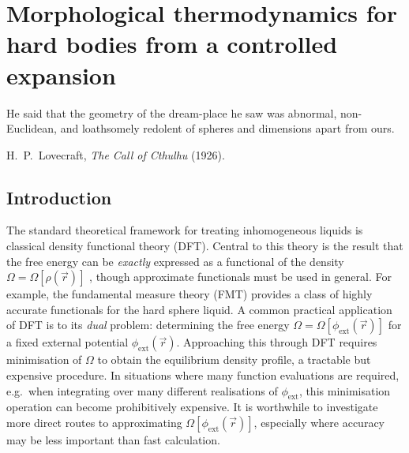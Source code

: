 \documentclass[11pt,twoside]{report}
\begin{document}
\chapter{Morphological thermodynamics for hard bodies from a controlled expansion}
\epigraph{He said that the geometry of the dream-place he saw was abnormal, non-Euclidean, and loathsomely redolent of spheres and dimensions apart from ours.}{H.\ P.\ Lovecraft, \emph{The Call of Cthulhu} (1926).}
\label{chapter:resummation}

\section{Introduction}

The standard theoretical framework for treating inhomogeneous liquids is classical density functional theory (DFT).
Central to this theory is the result that the free energy can be \emph{exactly} expressed as a functional of the density $\Omega = \Omega[\rho(\vec{r})]$ \cite{EvansAP1979}, though approximate functionals must be used in general.
For example, the fundamental measure theory (FMT) \cite{RosenfeldPRL1989} provides a class of highly accurate functionals for the hard sphere liquid.
A common practical application of DFT is to its \emph{dual} problem: determining the free energy $\Omega = \Omega[\phi_\mathrm{ext}(\vec{r})]$ for a fixed external potential $\phi_\mathrm{ext}(\vec{r})$.
Approaching this through DFT requires minimisation of $\Omega$ to obtain the equilibrium density profile, a tractable but expensive procedure.
In situations where many function evaluations are required, e.g.\ when integrating over many different realisations of $\phi_\mathrm{ext}$, this minimisation operation can become prohibitively expensive.
It is worthwhile to investigate more direct routes to approximating $\Omega[\phi_\mathrm{ext}(\vec{r})]$, especially where accuracy may be less important than fast calculation.
\end{document}
